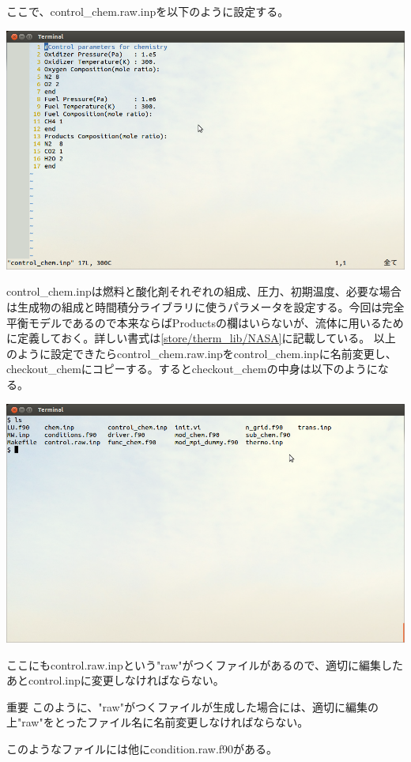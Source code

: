 \documentclass{jsarticle}
\begin{document}
ここで、control\_chem.raw.inpを以下のように設定する。
\begin{center}
\includegraphics[width=.8\textwidth,bb=0 0 962 577]{tutorial_img/080.png}
\end{center}
control\_chem.inpは燃料と酸化剤それぞれの組成、圧力、初期温度、必要な場合は生成物の組成と時間積分ライブラリに使うパラメータを設定する。今回は完全平衡モデルであるので本来ならばProductsの欄はいらないが、流体に用いるために定義しておく。詳しい書式は\ref{store/therm_lib/NASA}に記載している。
以上のように設定できたらcontrol\_chem.raw.inpをcontrol\_chem.inpに名前変更し、checkout\_chemにコピーする。するとcheckout\_chemの中身は以下のようになる。
\begin{center}
\includegraphics[width=.8\textwidth,bb=0 0 962 577]{tutorial_img/090.png}
\end{center}
ここにもcontrol.raw.inpという"raw"がつくファイルがあるので、適切に編集したあとcontrol.inpに変更しなければならない。
\begin{itembox}[l]{重要}
このように、"raw"がつくファイルが生成した場合には、適切に編集の上"raw"をとったファイル名に名前変更しなければならない。
\end{itembox}
このようなファイルには他にcondition.raw.f90がある。
\end{document}
